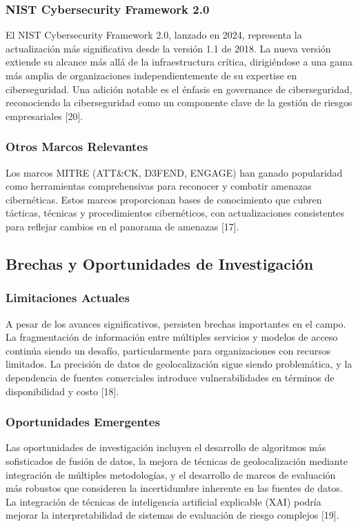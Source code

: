 \subsubsection{NIST Cybersecurity Framework 2.0}

El NIST Cybersecurity Framework 2.0, lanzado en 2024, representa la actualización más significativa desde la versión 1.1 de 2018. La nueva versión extiende su alcance más allá de la infraestructura crítica, dirigiéndose a una gama más amplia de organizaciones independientemente de su expertise en ciberseguridad. Una adición notable es el énfasis en governance de ciberseguridad, reconociendo la ciberseguridad como un componente clave de la gestión de riesgos empresariales [20].

\subsubsection{Otros Marcos Relevantes}

Los marcos MITRE (ATT\&CK, D3FEND, ENGAGE) han ganado popularidad como herramientas comprehensivas para reconocer y combatir amenazas cibernéticas. Estos marcos proporcionan bases de conocimiento que cubren tácticas, técnicas y procedimientos cibernéticos, con actualizaciones consistentes para reflejar cambios en el panorama de amenazas [17].

\subsection{Brechas y Oportunidades de Investigación}

\subsubsection{Limitaciones Actuales}

A pesar de los avances significativos, persisten brechas importantes en el campo. La fragmentación de información entre múltiples servicios y modelos de acceso continúa siendo un desafío, particularmente para organizaciones con recursos limitados. La precisión de datos de geolocalización sigue siendo problemática, y la dependencia de fuentes comerciales introduce vulnerabilidades en términos de disponibilidad y costo [18].

\subsubsection{Oportunidades Emergentes}

Las oportunidades de investigación incluyen el desarrollo de algoritmos más sofisticados de fusión de datos, la mejora de técnicas de geolocalización mediante integración de múltiples metodologías, y el desarrollo de marcos de evaluación más robustos que consideren la incertidumbre inherente en las fuentes de datos. La integración de técnicas de inteligencia artificial explicable (XAI) podría mejorar la interpretabilidad de sistemas de evaluación de riesgo complejos [19].
